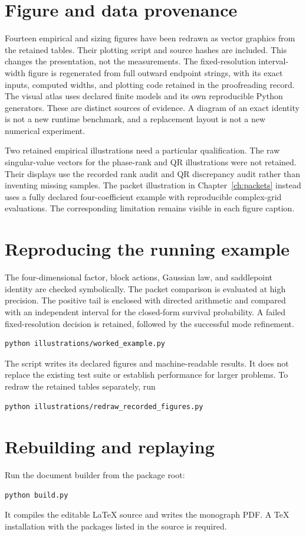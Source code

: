 \section{Figure and data provenance}\label{app:provenance}
Fourteen empirical and sizing figures have been redrawn as vector graphics from the retained tables. Their plotting script and source hashes are included. This changes the presentation, not the measurements. The fixed-resolution
interval-width figure is regenerated from full outward endpoint strings,
with its exact inputs, computed widths, and plotting code retained in the
proofreading record. The visual atlas
uses declared finite models and its own reproducible Python generators.
These are distinct sources of evidence. A diagram of an exact identity is
not a new runtime benchmark, and a replacement layout is not a new numerical
experiment.

Two retained empirical illustrations need a particular qualification. The raw
singular-value vectors for the phase-rank and QR illustrations were not retained. Their
displays use the recorded rank audit and QR discrepancy audit rather than inventing
missing samples. The packet illustration in Chapter~\ref{ch:packets} instead uses a
fully declared four-coefficient example with reproducible complex-grid evaluations.
The corresponding limitation remains visible in each figure caption.

\section{Reproducing the running example}
The four-dimensional factor, block actions, Gaussian law, and saddlepoint identity are checked symbolically. The packet comparison is evaluated at high precision. The positive tail is enclosed with directed arithmetic and compared with an independent interval for the closed-form survival probability. A failed fixed-resolution decision is retained, followed by the successful mode refinement.
\begin{lstlisting}
python illustrations/worked_example.py
\end{lstlisting}
The script writes its declared figures and machine-readable results. It does not replace the existing test suite or establish performance for larger problems. To redraw the retained tables separately, run
\begin{lstlisting}
python illustrations/redraw_recorded_figures.py
\end{lstlisting}

\section{Rebuilding and replaying}
Run the document builder from the package root:
\begin{lstlisting}
python build.py
\end{lstlisting}
It compiles the editable LaTeX source and writes the monograph PDF. A TeX
installation with the packages listed in the source is required.

